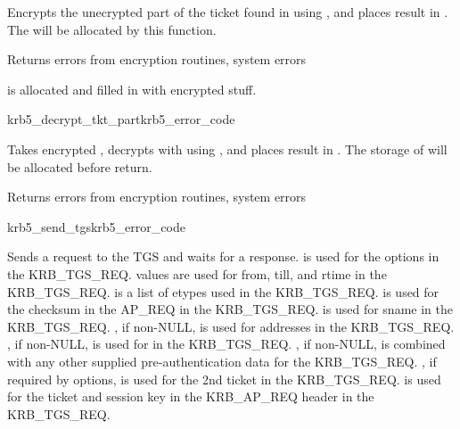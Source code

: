 \internalfunc

\begin{sloppypar}
Encrypts the unecrypted part of the ticket found in 
 using
, and places result in 
.
The  will be allocated by this
function.
\end{sloppypar}

Returns errors from encryption routines, system errors

 is allocated and filled in with
encrypted stuff.

\begin{funcdecl}{krb5_decrypt_tkt_part}{krb5_error_code}{\funcinout}
\funcin
{}
\funcinout
{}
\end{funcdecl}

\internalfunc

Takes encrypted , decrypts with
using , and places result in
.  The storage of
 will be allocated before return.

Returns errors from encryption routines, system errors

\begin{funcdecl}{krb5_send_tgs}{krb5_error_code}{\funcinout}
\funcin
{}
\funcinout
{}
\funcout
{}
\end{funcdecl}

\internalfunc

Sends a request to the TGS and waits for a response.
 is used for the options in the KRB_TGS_REQ.
 values are used for from, till, and rtime in the
KRB_TGS_REQ.
 is a list of etypes used in the KRB_TGS_REQ.
 is used for the checksum in the AP_REQ in the KRB_TGS_REQ.
 is used for sname in the KRB_TGS_REQ.
, if non-NULL, is used for addresses in the KRB_TGS_REQ.
, if non-NULL, is used for
 in the KRB_TGS_REQ.  
, if non-NULL, is combined with any other supplied
pre-authentication data for the KRB_TGS_REQ.
, if required by options, is used for the 2nd
ticket in the KRB_TGS_REQ.
 is used for the ticket and session key in the KRB_AP_REQ header in the KRB_TGS_REQ.

